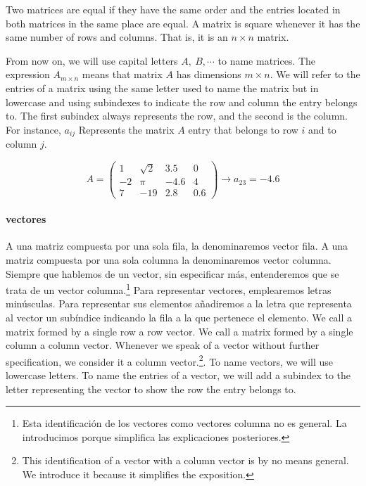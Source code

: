 \begin{paracol}{2}
Two matrices are equal if they have the same order and the entries located in both matrices in the same place are equal. A matrix is square whenever it has the same number of rows and columns. That is, it is an $n\times n$ matrix.

From now on, we will use capital letters $A,\ B,\cdots$ to name matrices. The expression $A_{m\times n}$ means that matrix $A$ has dimensions $m\times n$. We will refer to the entries of a matrix using the same letter used to name the matrix but in lowercase and using subindexes to indicate the row and column the entry belongs to. The first subindex always represents the row, and the second is the column. For instance, $a_{ij}$ Represents the matrix $A$ entry that belongs to row $i$ and to column $j$.
\end{paracol}
\begin{equation*}
A=
\begin{pmatrix}
1& \sqrt{2}& 3.5& 0\\
-2& \pi& -4.6& 4\\
7& -19& 2.8& 0.6
\end{pmatrix}
\rightarrow a_{23}=-4.6
\end{equation*}
\begin{paracol}{2}
\paragraph{vectores}
A una matriz compuesta por una sola fila, la denominaremos vector fila. A una matriz compuesta por una sola columna la denominaremos vector columna. Siempre que hablemos de un vector, sin especificar más, entenderemos que se trata de un vector columna.\footnote{Esta identificación de los vectores como vectores columna no es general. La introducimos porque simplifica las explicaciones posteriores.} Para representar vectores, emplearemos letras minúsculas. Para representar sus elementos añadiremos a la letra que representa al vector un subíndice indicando la fila a la que pertenece el elemento.
\switchcolumn
We call a matrix formed by a single row a row vector. We call a matrix formed by a single column a column vector. Whenever we speak of a vector without further specification, we consider it a column vector.\footnote{This identification of a vector with a column vector is by no means general. We introduce it because it simplifies the exposition.}. To name vectors, we will use lowercase letters. To name the entries of a vector, we will add a subindex to the letter representing the vector to show the row the entry belongs to. 
\end{paracol}
